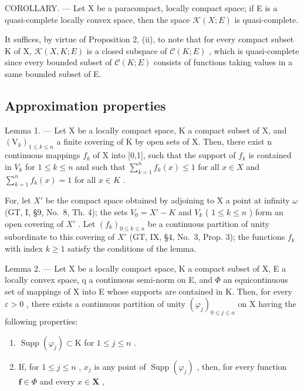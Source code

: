 COROLLARY. --- Let X be a paracompact, locally compact space; if E is a quasi-complete locally convex space, then the space \(\mathcal{K}(X;E)\) is quasi-complete.

It suffices, by virtue of Proposition 2, (ii), to note that for every compact subset K of X, \(\mathcal{K}(X,K;E)\) is a closed subspace of \(\mathcal{C}(K;E)\) , which is quasi-complete since every bounded subset of \(\mathcal{C}(K;E)\) consists of functions taking values in a same bounded subset of E.

\subsection{Approximation properties}

Lemma 1. --- Let X be a locally compact space, K a compact subset of X, and \((\mathrm{V}_{k})_{1\leqslant k\leqslant n}\) a finite covering of K by open sets of X. Then, there exist n continuous mappings \(f_{k}\) of X into {[}0,1{]}, such that the support of \(f_{k}\) is contained in \(V_{k}\) for \(1\leqslant k\leqslant n\) and such that \(\sum_{k=1}^{n}f_{k}(x)\leqslant1\) for all \(x\in X\) and \(\sum_{k=1}^{n}f_{k}(x)=1\) for all \(x\in K\) .

For, let \(X'\) be the compact space obtained by adjoining to X a point at infinity \(\omega\) (GT, I, §9, No.~8, Th. 4); the sets \(V_{0} = X' - K\) and \(V_{k}\) ( \(1 \leqslant k \leqslant n\) ) form an open covering of \(X'\) . Let \((f_{k})_{0 \leqslant k \leqslant n}\) be a continuous partition of unity subordinate to this covering of \(X'\) (GT, IX, §4, No.~3, Prop. 3); the functions \(f_{k}\) with index \(k \geqslant 1\) satisfy the conditions of the lemma.

Lemma 2. --- Let X be a locally compact space, K a compact subset of X, E a locally convex space, q a continuous semi-norm on E, and \(\Phi\) an equicontinuous set of mappings of X into E whose supports are contained in K. Then, for every \(\varepsilon > 0\) , there exists a continuous partition of unity \((\varphi_{j})_{0 \leqslant j \leqslant n}\) on X having the following properties:

\begin{enumerate}
\def\labelenumi{(\roman{enumi})}
\item
  \(\operatorname{Supp}(\varphi_j) \subset \mathrm{K}\) for \(1 \leqslant j \leqslant n\) .
\item
  If, for \(1 \leqslant j \leqslant n\) , \(x_j\) is any point of \(\operatorname{Supp}(\varphi_j)\) , then, for every function \(\mathbf{f} \in \Phi\) and every \(x \in \mathbf{X}\) ,
\end{enumerate}

